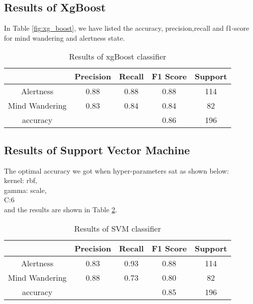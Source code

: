 \subsection{Results of XgBoost }
In Table \ref{fig:xg_boost}, we have listed the accuracy, precision,recall and f1-score for mind wandering and alertness state.  
\begin{table}[ht]
    \centering
     \caption{Results of xgBoost classifier }
     {\renewcommand{\arraystretch}{1.2}
    \begin{tabular}{ccccc}
       \hline
       \hline
         & Precision & Recall & F1 Score & Support \\
        \hline
          Alertness   &    0.88    &  0.88      & 0.88      & 114 \\
         Mind Wandering      & 0.83 &     0.84      & 0.84       & 82 \\
    accuracy   &            &            & 0.86      & 196 \\
          \hline
          \hline
    \end{tabular}
    }
    \label{tab:xqboost_res}
\end{table}

\subsection{Results of Support Vector Machine }
The optimal accuracy we got when hyper-parameters sat as shown below:\\
kernel: rbf,\\
gamma: scale,\\
C:6 \\ 
and the results are shown in Table \ref{tab:SVM_res}.
\begin{table}[ht]
    \centering
    \caption{Results of SVM classifier}
    {\renewcommand{\arraystretch}{1.2}
    \begin{tabular}{ccccc}
       \hline
       \hline
         & Precision & Recall & F1 Score & Support \\
        \hline
         Alertness    &   0.83 &    0.93 &     0.88 &       114\\
         Mind Wandering    &   0.88  &    0.73 &      0.80      &  82 \\
        accuracy    &          &            &     0.85      & 196 \\
          \hline
          \hline
    \end{tabular}
    }
    \label{tab:SVM_res}
\end{table}
